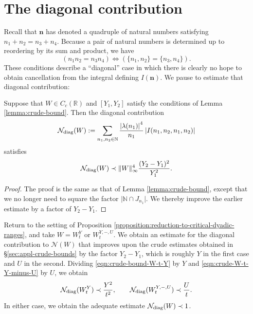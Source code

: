 \documentclass[reqno]{amsart} 
\begin{document}
\section{The diagonal contribution}\label{sec:cqx50az6mj}
Recall that $\mathbf{n}$ has denoted a quadruple of natural numbers satisfying $n _1 + n _2 = n _3 + n _4$.  Because a pair of natural numbers is determined up to reordering by its sum and product, we have
\begin{equation*}
  (n_1 n_2 = n_3 n_4) \iff ( \{n_1, n_2\} = \{n_3, n_4\}).
\end{equation*}
These conditions describe a ``diagonal'' case in which there is clearly no hope to obtain cancellation from the integral defining $I(\mathbf{n})$.  We pause to estimate that diagonal contribution:
\begin{lemma}
  Suppose that $W \in C_c(\mathbb{R})$ and $[Y_1,Y_2]$ satisfy the conditions of Lemma \ref{lemma:crude-bound}.  Then the diagonal contribution
  \begin{equation*}
    \mathcal{N}_{\operatorname{diag}}(W) := \sum _{n_1, n_2 \in \mathbb{N}}
    \frac{\left\lvert \lambda (n _1 ) \right\rvert ^4 }{ n _1 } \left\lvert I (n _1, n _2, n _1, n _2 ) \right\rvert
  \end{equation*}
  satisfies
  \begin{equation*}
    \mathcal{N}_{\operatorname{diag}}(W)
    \prec \lVert W \rVert_{\infty}^4 \frac{(Y _2 - Y _1 ) ^2 }{Y_1 ^2}.
  \end{equation*}
\end{lemma}
\begin{proof}
  The proof is the same as that of Lemma \ref{lemma:crude-bound}, except that we no longer need to square the factor $\lvert \mathbb{N} \cap J _{n_1} \rvert$.  We thereby improve the earlier estimate by a factor of $Y_2 - Y_1$.
\end{proof}
Return to the setting of Proposition \ref{proposition:reduction-to-critical-dyadic-ranges}, and take $W = W_t^Y$ or $W_t^{Y,-,U}$.  We obtain an estimate for the diagonal contribution to $\mathcal{N}(W)$ that improves upon the crude estimates obtained in \S\ref{sec:appl-crude-bounds} by the factor $Y_2 - Y_1$, which is roughly $Y$ in the first case and $U$ in the second.  Dividing \eqref{eqn:crude-bound-W-t-Y} by $Y$ and \eqref{eqn:crude-W-t-Y-minus-U} by $U$, we obtain
\begin{equation*}
  \mathcal{N}_{\operatorname{diag}} (W_t^Y) \prec \frac{Y^2}{t^2}, \qquad
  \mathcal{N}_{\operatorname{diag}} (W_t^{Y,-,U}) \prec \frac{U}{t}.
\end{equation*}
In either case, we obtain the adequate estimate $\mathcal{N}_{\operatorname{diag}}(W) \prec 1$.
\end{document}
